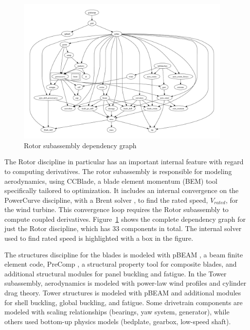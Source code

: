\documentclass[]{aiaa-tc} %
\begin{document}
    \begin{figure}[!htbp]
        \centering
        \includegraphics[width=0.95\textwidth]{images/rotor_depgraph}
        \caption{Rotor subassembly dependency graph}
        \label{fig:wt_sub_depgraph}
    \end{figure}

    The Rotor discipline in particular has an important internal feature with regard to computing derivatives.
    The rotor subassembly is responsible for modeling aerodynamics, using CCBlade\cite{NING:BEM},
    a blade element momentum (BEM) tool specifically tailored to optimization. It includes
    an internal convergence on the PowerCurve discipline, with a Brent solver \cite{Brent1971}, to find the
    rated speed, $V_{rated}$, for the wind turbine. This convergence loop requires the Rotor
    subassembly to compute coupled derivatives. Figure~\ref{fig:wt_sub_depgraph} shows the complete
    dependency graph for just the Rotor discipline, which has 33 components in total.  The internal solver used to
    find rated speed is highlighted with a box in the figure.

    The structures discipline for the blades is modeled with pBEAM \cite{Ning2013b},
    a beam finite element code, PreComp \cite{Bir2005}, a structural property tool for
    composite blades, and additional structural modules for panel buckling and fatigue. In the Tower subassembly,
    aerodynamics is modeled with power-law wind profiles and cylinder drag theory.
    Tower structures is modeled with pBEAM and additional modules for shell buckling,
    global buckling, and fatigue.  Some drivetrain components are modeled with scaling
    relationships (bearings, yaw system, generator), while others used bottom-up physics
    models (bedplate, gearbox, low-speed shaft).
\end{document}
